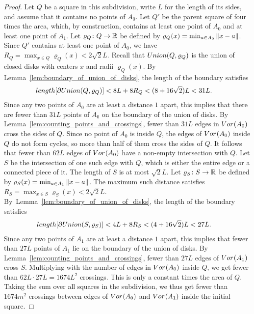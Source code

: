 \documentclass[10pt,a4paper]{amsart}
\newcommand{\Edist}[2]      {\mm{\|{#1}-{#2}\|}}
\newcommand{\Rspace}        {\mm{{\mathbb R}}}
\newcommand{\Union}[2]      {\mm{\rm Union}{({#1},{#2})}}
\newcommand{\Voronoi}[2]    {\mm{{\rm Vor}_{#1}{({#2})}}}
\newcommand{\length}[1]     {\mm{\rm length}{[{#1}]}}
\newcommand {\mm}[1]   {\ifmmode{#1}\else{\mbox{\(#1\)}}\fi}
\begin{document}
\begin{proof}
  Let $Q$ be a square in this subdivision, write $L$ for the length of its sides, and assume that it contains no points of $A_0$.
  Let $Q'$ be the parent square of four times the area, which, by construction, contains at least one point of $A_0$ and at least one point of $A_1$.
  Let $\varrho_Q \colon Q \to \Rspace$ be defined by $\varrho_Q (x) = \min_{a \in A_0} \Edist{x}{a}$.
  Since $Q'$ contains at least one point of $A_0$, we have $R_Q = \max_{x \in Q} \varrho_Q (x) < 2 \sqrt{2} L$.
  Recall that $\Union{Q}{\varrho_Q}$ is the union of closed disks with centers $x$ and radii $\varrho_Q (x)$.
  By Lemma~\ref{lem:boundary_of_union_of_disks}, the length of the boundary satisfies
  \begin{align}
    \length{\partial \Union{Q}{\varrho_Q}}  &<  8L + 8R_Q  < (8 + 16 \sqrt{2}) L  <  31 L .
  \end{align}
  Since any two points of $A_0$ are at least a distance $1$ apart, this implies that there are fewer than $31 L$ points of $A_0$ on the boundary of the union of disks.
  By Lemma~\ref{lem:counting_points_and_crossings}, fewer than $31 L$ edges in $\Voronoi{}{A_0}$ cross the sides of $Q$.
  Since no point of $A_0$ is inside $Q$, the edges of $\Voronoi{}{A_0}$ inside $Q$ do not form cycles, so more than half of them cross the sides of $Q$.
  It follows that fewer than $62 L$ edges of $\Voronoi{}{A_0}$ have a non-empty intersection with $Q$.
  Let $S$ be the intersection of one such edge with $Q$, which is either the entire edge or a connected piece of it.
  The length of $S$ is at most $\sqrt{2} L$.
  Let $\varrho_S \colon S \to \Rspace$ be defined by $\varrho_S (x) = \min_{a \in A_1} \Edist{x}{a}$.
  The maximum such distance satisfies $R_S = \max_{x \in S} \varrho_S (x) < 2 \sqrt{2} L$.
  By~Lemma~\ref{lem:boundary_of_union_of_disks}, the length of the boundary satisfies
  \begin{align}
    \length{\partial \Union{S}{\varrho_S}}  &<  4L+8R_S  <  (4 + 16 \sqrt{2}) L  <  27 L .
  \end{align}
  Since any two points of $A_1$ are at least a distance $1$ apart, this implies that fewer than $27 L$ points of $A_1$ lie on the boundary of the union of disks.
  By Lemma~\ref{lem:counting_points_and_crossings}, fewer than $27 L$ edges of $\Voronoi{}{A_1}$ cross $S$.
  Multiplying with the number of edges in $\Voronoi{}{A_0}$ inside $Q$, we get fewer than $62 L \cdot 27 L = 1674 L^2$ crossings.
  This is only a constant times the area of $Q$.
  Taking the sum over all squares in the subdivision, we thus get fewer than $1674 m^2$ crossings between edges of $\Voronoi{}{A_0}$ and $\Voronoi{}{A_1}$ inside the initial square.
  

\end{proof}
\end{document}
